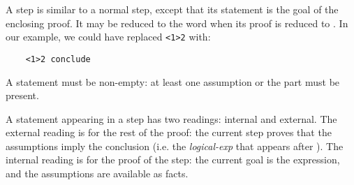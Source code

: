 \begin{syn}
 \is
      
\alt{} 
\end{syn}


A  step is similar to a normal step, except that its
statement is the goal of the enclosing proof.  It may be reduced to
the word  when its proof is reduced to
. In our example, we could have replaced
\verb"<1>2" with:
\begin{verbatim}
    <1>2 conclude
\end{verbatim}

\begin{syn}
 \is
\end{syn}

A statement must be non-empty: at least one assumption or the
 part must be present.

A statement appearing in a step has two readings: internal and
external.  The external reading is for the rest of the
proof: the current step proves that the assumptions imply the
conclusion (i.e. the {\em logical-exp} that appears after
).  The internal reading is for the proof of the step:
the current goal is the  expression, and the
assumptions are available as facts.

\begin{syn}
 \is
      \tok{ :} 
\alt{}  \tok{ :} 
\alt{}  \tok{ =} 
\end{syn}


